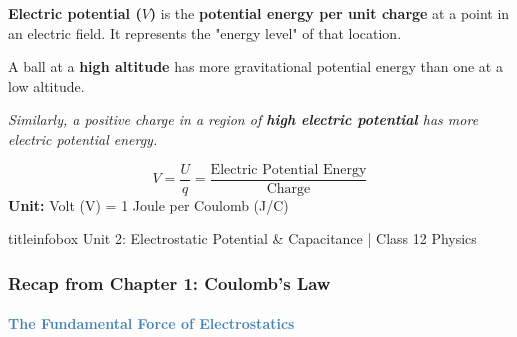 \begin{frame}
\begin{frame}
\begin{keybox}
\vspace{0.1cm}
\textbf{Electric potential ($V$)} is the \textbf{\textcolor{importantRed}{potential energy per unit charge}} at a point in an electric field. It represents the "energy level" of that location.
\vspace{0.1cm}
\end{keybox}

\vspace{0.35cm}

\begin{examplebox}
\vspace{0.1cm}
A ball at a \textbf{high altitude} has more gravitational potential energy than one at a low altitude.
\vspace{0.1cm}
\begin{center}
\textit{Similarly, a positive charge in a region of \textbf{high electric potential} has more electric potential energy.}
\end{center}
\end{examplebox}

\vspace{0.35cm}

\begin{formulabox}
\vspace{0.2cm}
\begin{equation*}
\boxed{V = \frac{U}{q} = \frac{\text{Electric Potential Energy}}{\text{Charge}}}
\end{equation*}
\vspace{0.15cm}
\textbf{Unit:}  Volt (V) = 1 Joule per Coulomb (J/C)
\vspace{0.1cm}
\end{formulabox}

\vfill

\begin{beamercolorbox}[wd=\textwidth,ht=0.5cm,dp=0.1cm,center]{titleinfobox}
    \small\color{coolgray} Unit 2: Electrostatic Potential & Capacitance | Class 12 Physics
\end{beamercolorbox}
\end{frame}

\begin{frame}
\frametitle{\textsf{\textbf{Recap from Chapter 1:} Coulomb's Law}}
\framesubtitle{\textcolor{steelblue}{The Fundamental Force of Electrostatics}}


\end{frame}
\end{frame}
